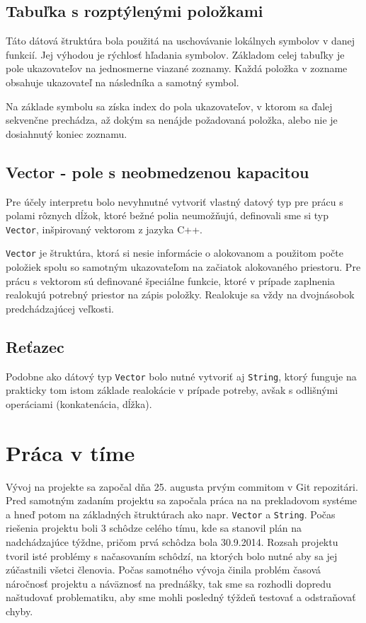 \documentclass[12pt,a4paper,titlepage,final]{article}
\begin{document}
\subsection{Tabuľka s rozptýlenými položkami}
Táto dátová štruktúra bola použitá na uschovávanie lokálnych symbolov v danej
 funkcií. Jej výhodou je rýchlosť hľadania symbolov. 
Základom celej tabuľky je pole ukazovateľov na jednosmerne viazané zoznamy.
Každá položka v zozname obsahuje ukazovateľ na následníka a samotný symbol.

Na základe symbolu sa získa index do pola ukazovateľov, v ktorom sa ďalej
 sekvenčne prechádza, až dokým sa nenájde požadovaná položka, alebo nie je
 dosiahnutý koniec zoznamu.
 
\subsection{Vector - pole s neobmedzenou kapacitou}
Pre účely interpretu bolo nevyhnutné vytvoriť vlastný datový typ pre prácu
s polami rôznych dĺžok, ktoré bežné polia neumožňujú, definovali sme si
typ \texttt{Vector}, inšpirovaný vektorom z jazyka C++. 

\texttt{Vector} je štruktúra, ktorá si nesie informácie o alokovanom a použitom 
počte položiek spolu so samotným ukazovateľom na začiatok alokovaného priestoru. 
Pre prácu s vektorom sú definované špeciálne funkcie, ktoré v prípade zaplnenia
realokujú potrebný priestor na zápis položky. Realokuje sa vždy na dvojnásobok
predchádzajúcej veľkosti.


\subsection{Reťazec}
Podobne ako dátový typ \texttt{Vector} bolo nutné vytvoriť aj \texttt{String},
ktorý funguje na prakticky tom istom základe realokácie v prípade potreby,
avšak s odlišnými operáciami (konkatenácia, dĺžka).


\section{Práca v tíme}
Vývoj na projekte sa započal dňa 25. augusta prvým commitom v Git repozitári.
 Pred samotným zadaním projektu sa započala práca na na prekladovom systéme
 a hneď potom na základných štruktúrach ako 
 napr. \texttt{Vector} a \texttt{String}.
Počas riešenia projektu boli 3 schôdze celého tímu, kde sa stanovil plán na
nadchádzajúce týždne, pričom prvá schôdza bola 30.9.2014.
Rozsah projektu tvoril isté problémy s načasovaním schôdzí, na ktorých bolo
nutné aby sa jej zúčastnili všetci členovia. Počas samotného vývoja
činila problém časová náročnosť projektu a náväznosť na prednášky, tak sme sa
rozhodli dopredu naštudovať problematiku, aby sme mohli posledný týždeň testovať
a odstraňovať chyby.
\end{document}
